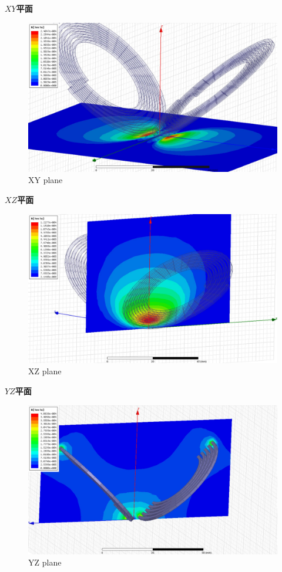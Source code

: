 \documentclass{article}
\begin{document}
\newpage
\textbf{$XY$平面}

\begin{figure}[h]
  \centering
  \includegraphics[scale=0.2]{simulation/res1.jpg}
  \caption{XY plane}
  \label{fig:example}
\end{figure}\textbf{}

\textbf{$XZ$平面}

\begin{figure}[h]
  \centering
  \includegraphics[scale=0.2]{simulation/res2.jpg}
  \caption{XZ plane}
  \label{fig:example}
\end{figure}\textbf{}

\textbf{$YZ$平面}

\begin{figure}[h]
  \centering
  \includegraphics[scale=0.2]{simulation/res3.jpg}
  \caption{YZ plane}
  \label{fig:example}
\end{figure}\textbf{}
\end{document}
